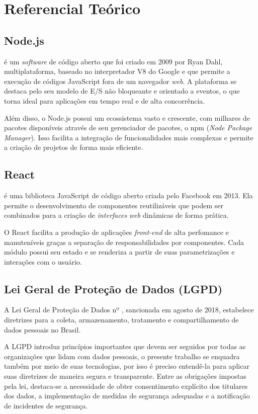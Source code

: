 \chapter{Referencial Teórico}

\section{Node.js}

 é um \emph{software} de código aberto que foi criado em 2009 por Ryan Dahl, multiplataforma, baseado no interpretador V8 do Google e que permite a execução de códigos JavaScript fora de um navegador \emph{web}. A plataforma se destaca pelo seu modelo de E/S não bloqueante e orientado a eventos, o que torna ideal para aplicações em tempo real e de alta concorrência.

Além disso, o Node.js possui um ecossistema vasto e crescente, com milhares de pacotes disponíveis através de seu gerenciador de pacotes, o npm (\emph{Node Package Manager}). Isso facilita a integração de funcionalidades mais complexas e permite a criação de projetos de forma mais eficiente.

\section{React}

 é uma biblioteca JavaScript de código aberto criada pelo Facebook em 2013. Ela permite o desenvolvimento de componentes reutilizáveis que podem ser combinados para a criação de \emph{interfaces} \emph{web} dinâmicas de forma prática.

O React facilita a produção de aplicações \emph{front-end} de alta perfomance e manuteníveis graças a separação de responsabilidades por componentes. Cada módulo possui seu estado e se renderiza a partir de suas parametrizações e interações com o usuário.

\section{Lei Geral de Proteção de Dados (LGPD)}

A Lei Geral de Proteção de Dados nº , sancionada em agosto de 2018, estabelece diretrizes para a coleta, armazenamento, tratamento e compartilhamento de dados pessoais no Brasil.

A LGPD introduz princípios importantes que devem ser seguidos por todas as organizações que lidam com dados pessoais, o presente trabalho se enquadra também por meio de suas tecnologias, por isso é preciso entendê-la para aplicar suas diretrizes de maneira segura e transparente. Entre as obrigações impostas pela lei, destaca-se a necessidade de obter consentimento explícito dos titulares dos dados, a implementação de medidas de segurança adequadas e a notificação de incidentes de segurança.